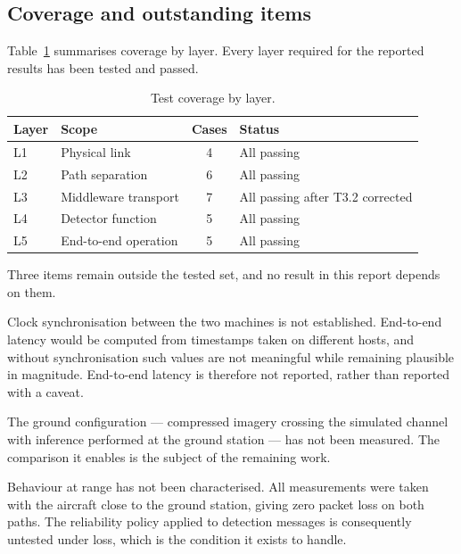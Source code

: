 \subsection{Coverage and outstanding items}
\label{sec:test-coverage}

Table~\ref{tab:test-coverage} summarises coverage by layer. Every layer
required for the reported results has been tested and passed.

\begin{table}[htbp]
\centering
\caption{Test coverage by layer.}
\label{tab:test-coverage}
\begin{tabular}{@{}llcl@{}}
\toprule
Layer & Scope & Cases & Status \\
\midrule
L1 & Physical link            & 4 & All passing \\
L2 & Path separation          & 6 & All passing \\
L3 & Middleware transport     & 7 & All passing after T3.2 corrected \\
L4 & Detector function        & 5 & All passing \\
L5 & End-to-end operation     & 5 & All passing \\
\bottomrule
\end{tabular}
\end{table}

Three items remain outside the tested set, and no result in this report
depends on them.

Clock synchronisation between the two machines is not established. End-to-end
latency would be computed from timestamps taken on different hosts, and
without synchronisation such values are not meaningful while remaining
plausible in magnitude. End-to-end latency is therefore not reported, rather
than reported with a caveat.

The ground configuration --- compressed imagery crossing the simulated
channel with inference performed at the ground station --- has not been
measured. The comparison it enables is the subject of the remaining work.

Behaviour at range has not been characterised. All measurements were taken
with the aircraft close to the ground station, giving zero packet loss on
both paths. The reliability policy applied to detection messages is
consequently untested under loss, which is the condition it exists to
handle.

